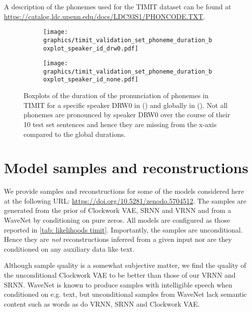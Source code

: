 {A description of the phonemes used for the TIMIT dataset can be found at \url{https://catalog.ldc.upenn.edu/docs/LDC93S1/PHONCODE.TXT}.

\begin{figure}[t!]
    \centering
    \hfill
    \begin{subfigure}[b]{\textwidth}
        \centering
        \texttt{[image: graphics/timit\_validation\_set\_phoneme\_duration\_boxplot\_speaker\_id\_drw0.pdf]}
        \caption{}
        \label{fig: timit validation set phoneme duration DRW0}
    \end{subfigure}
    \begin{subfigure}[b]{\textwidth}
        \centering
        \texttt{[image: graphics/timit\_validation\_set\_phoneme\_duration\_boxplot\_speaker\_id\_none.pdf]}
        \caption{}
        \label{fig: timit validation set phoneme duration global}
    \end{subfigure}
    \caption{Boxplots of the duration of the pronunciation of phonemes in TIMIT for a specific speaker DRW0 in () and globally in (). Not all phonemes are pronounced by speaker DRW0 over the course of their 10 test set sentences and hence they are missing from the x-axis compared to the global durations.}
    \label{fig: timit validation set phoneme duration}
\end{figure}

\section{Model samples and reconstructions}\label{app: model samples and reconstructions}
We provide samples and reconstructions for some of the models considered here at the following URL: \url{https://doi.org/10.5281/zenodo.5704512}.
The samples are generated from the prior of Clockwork VAE, SRNN and VRNN and from a WaveNet by conditioning on pure zeros. All models are configured as those reported in \cref{tab: likelihoods timit}.
Importantly, the samples are unconditional. Hence they are \emph{not} reconstructions inferred from a given input nor are they conditioned on any auxiliary data like text.

Although sample quality is a somewhat subjective matter, we find the quality of the unconditional Clockwork VAE to be better than those of our VRNN and SRNN. WaveNet is known to produce samples with intelligible speech when conditioned on e.g. text, but unconditional samples from WaveNet lack semantic content such as words as do VRNN, SRNN and Clockwork VAE.

}
